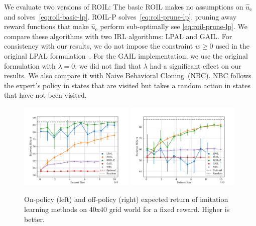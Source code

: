 \documentclass[10pt]{article}
\renewcommand{\cite}{\citep}
\theoremstyle{plain}
\theoremstyle{remark}
\begin{document}

We evaluate two versions of ROIL: The basic ROIL makes no assumptions on $\hat{u}_{\mathrm{e}}$ and solves~\eqref{eq:roil-basic-lp}. ROIL-P solves~\eqref{eq:roil-prune-lp}, pruning away reward functions that make $\hat{u}_{\mathrm{e}}$ perform sub-optimally see \cref{eq:roil-prune-lp}. We compare these algorithms with two IRL algorithms: LPAL and GAIL. For consistency with our results, we do not impose the constraint $w \ge 0$ used in the original LPAL formulation~\cite{Syed2008}. For the GAIL implementation, we use the original formulation with $\lambda = 0$; we did not find that $\lambda$ had a significant effect on our results. We also compare it with Naive Behavioral Cloning~(NBC). NBC follows the expert's policy in states that are visited but takes a random action in states that have not been visited.

\begin{figure}
\centering \includegraphics[width=0.49\textwidth]{../src/plots/returns/40x40_gridworld_on_policy_returns.pdf} \includegraphics[width=0.49\textwidth]{../src/plots/returns/40x40_gridworld_off_policy_returns.pdf}
\caption{On-policy (left) and off-policy (right) expected return of imitation learning methods on 40x40 grid world for a fixed reward. Higher is better.}
\label{fig:grid-40}
\end{figure}
\end{document}
